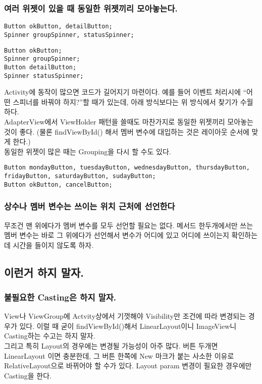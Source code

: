 \subsubsection{여러 위젯이 있을 때 동일한 위젯끼리 모아놓는다.}
\begin{lstlisting}[frame=single]
Button okButton, detailButton;
Spinner groupSpinner, statusSpinner;
\end{lstlisting}

\begin{lstlisting}[frame=single]
Button okButton;
Spinner groupSpinner;
Button detailButton;
Spinner statusSpinner;
\end{lstlisting}

Activity에 동작이 많으면 코드가 길어지기 마련이다. 
예를 들어 이벤트 처리시에 ``어떤 스피너를 바꿔야 하지?''할 때가 있는데, 아래 방식보다는 위 방식에서 찾기가 수월하다.\\
AdapterView에서 ViewHolder 패턴을 쓸때도 마찬가지로 동일한 위젯끼리 모아놓는 것이 좋다.
(물론 findViewById() 해서 멤버 변수에 대입하는 것은 레이아웃 순서에 맞게 한다.)\\
동일한 위젯이 많은 때는 Grouping을 다시 할 수도 있다.
\begin{lstlisting}[frame=single]
Button mondayButton, tuesdayButton, wednesdayButton, thursdayButton, fridayButton, saturdayButton, sudayButton;
Button okButton, cancelButton;
\end{lstlisting}

\subsubsection{상수나 멤버 변수는 쓰이는 위치 근처에 선언한다}
무조건 맨 위에다가 멤버 변수를 모두 선언할 필요는 없다. 
메서드 한두개에서만 쓰는 멤버 변수는 바로 그 위에다가 선언해서 변수가 어디에 있고 어디에 쓰이는지 확인하는데 시간을 들이지 않도록 하자.

\subsection{이런거 하지 말자.}

\subsubsection{불필요한 Casting은 하지 말자.}
View나 ViewGroup에 Actvity상에서 기껏해야 Visibility만 조건에 따라 변경되는 경우가 있다. 이럴 때 굳이 findViewById()해서 LinearLayout이니 ImageView니 Casting하는 수고는 하지 말자.\\
그리고 특히 Layout의 경우에는 변경될 가능성이 아주 많다. 버튼 두개면 LinearLayout 이면 충분한데, 그 버튼 한쪽에 New 마크가 붙는 사소한 이유로 RelativeLayout으로 바뀌어야 할 수가 있다. Layout param 변경이 필요한 경우에만 Casting을 한다.

